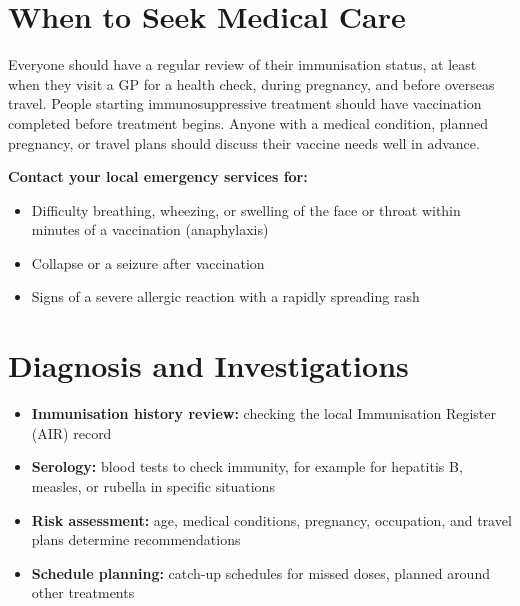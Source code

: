 \section*{When to Seek Medical Care}
Everyone should have a regular review of their immunisation status, at least when they visit a GP for a health check, during pregnancy, and before overseas travel. People starting immunosuppressive treatment should have vaccination completed before treatment begins. Anyone with a medical condition, planned pregnancy, or travel plans should discuss their vaccine needs well in advance.

\textbf{Contact your local emergency services for:}
\begin{itemize}
    \item Difficulty breathing, wheezing, or swelling of the face or throat within minutes of a vaccination (anaphylaxis)
    \item Collapse or a seizure after vaccination
    \item Signs of a severe allergic reaction with a rapidly spreading rash
\end{itemize}

\section*{Diagnosis and Investigations}
\begin{itemize}
    \item \textbf{Immunisation history review:} checking the local Immunisation Register (AIR) record
    \item \textbf{Serology:} blood tests to check immunity, for example for hepatitis B, measles, or rubella in specific situations
    \item \textbf{Risk assessment:} age, medical conditions, pregnancy, occupation, and travel plans determine recommendations
    \item \textbf{Schedule planning:} catch-up schedules for missed doses, planned around other treatments
\end{itemize}

